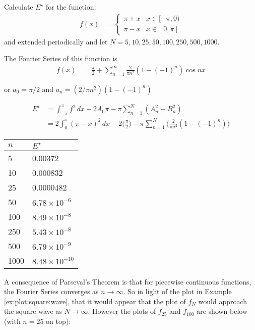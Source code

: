 \begin{example}
 Calculate $E^{\star}$ for the function:
 \begin{align*}
f(x) & = \begin{cases}
\pi+x & x \in [-\pi,0) \\
\pi-x & x \in [0,\pi]  
\end{cases}
\end{align*}
and extended periodically and let $N=5,10,25,50,100,250,500,1000$.  

\solution

The Fourier Series of this function is 
% 
\begin{align*}
f(x) & = \frac{\pi}{2} + \sum_{n=1}^{\infty} \frac{2}{\pi n^2} (1-(-1)^n) \cos nx 
\end{align*}

or $a_0 = \pi/2$ and $a_n = (2/\pi n^2)(1-(-1)^n) $

\begin{align*}
E^{\star} & = \int_{-\pi}^{\pi} f^2 \, dx - 2A_0\pi - \pi \sum_{n=1}^{N} (A_n^2 + B_n^2)  \\
& = 2\int_{0}^{\pi} (\pi-x)^2 \, dx - 2\biggl(\frac{\pi}{2}\biggr) - \pi \sum_{n=1}^{N}\biggl(\frac{2}{\pi n^2} (1-(-1)^n) \biggr) 
\end{align*}

\begin{tabular}{l|l}
$n$ & $E^{\star}$ \\ \hline
5 & 0.00372 \\
10 & 0.000832 \\
25 & 0.0000482 \\
50 & $6.78 \times 10^{-6} $ \\
100 & $8.49 \times 10^{-8} $ \\
250 & $ 5.43 \times 10^{-8} $ \\
500 & $6.79 \times 10^{-9} $ \\
1000 & $8.48 \times 10^{-10} $ 
\end{tabular}

\end{example}

A consequence of Parseval's Theorem is that for piecewise continuous functions, the Fourier Series converges as $n \rightarrow \infty$.  So in light of the plot in Example \ref{ex:plot:square:wave}, that it would appear that the plot of $f_N$ would approach the square wave as $N \rightarrow \infty$.  However the plots of $f_{25}$ and $f_{100}$ are shown below (with $n=25$ on top):


